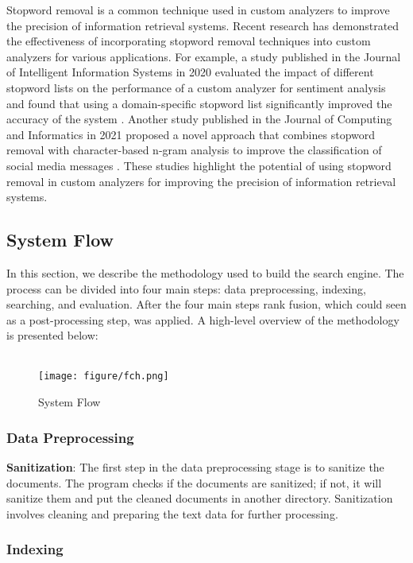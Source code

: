 \begin{itemize}
    Stopword removal is a common technique used in custom analyzers to improve the precision of information retrieval systems. Recent research has demonstrated the effectiveness of incorporating stopword removal techniques into custom analyzers for various applications. For example, a study published in the Journal of Intelligent Information Systems in 2020 evaluated the impact of different stopword lists on the performance of a custom analyzer for sentiment analysis and found that using a domain-specific stopword list significantly improved the accuracy of the system \cite{ertugrul2020comparative}. Another study published in the Journal of Computing and Informatics in 2021 proposed a novel approach that combines stopword removal with character-based n-gram analysis to improve the classification of social media messages \cite{mishra2021hybrid}. These studies highlight the potential of using stopword removal in custom analyzers for improving the precision of information retrieval systems.
    
\end{itemize}


\subsection{System Flow}
In this section, we describe the methodology used to build the search engine. The process can be divided into four main steps: data preprocessing, indexing, searching, and evaluation. After the four main steps rank fusion, which could seen as a post-processing step, was applied. A high-level overview of the methodology is presented below: \\
\\
\begin{figure}[!h]
  \centering
  \texttt{[image: figure/fch.png]}
  \caption{\centering System Flow}  
  \centering
  \label{fig:System_Flow}
\end{figure}

\subsubsection{Data Preprocessing} 
\textbf{Sanitization}: The first step in the data preprocessing stage is to sanitize the documents. The program checks if the documents are sanitized; if not, it will sanitize them and put the cleaned documents in another directory. Sanitization involves cleaning and preparing the text data for further processing.
\subsubsection{Indexing}

